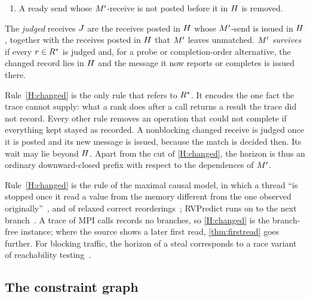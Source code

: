 \begin{definition}[Horizon]
\begin{enumerate}[leftmargin=*,label=(H\arabic*)]
  $\Hpre$ stays pending. Any later receive or probe of its rank that would take or report
  a message $r'$ accepts is removed, by \ref{E:order}.
\item\label{H:ready} A ready send whose $M'$-receive is not posted before it in
  $\Hpre$ is removed.
\end{enumerate}
The \emph{judged} receives $J$ are the receives posted in $\Hpre$ whose
$M'$-send is issued in $\Hpre$, together with the receives posted in $\Hpre$ that
$M'$ leaves unmatched. $M'$ \emph{survives} if every $r\in R^{*}$ is judged and, for a
probe or completion-order alternative, the changed record lies in $\Hpre$ and the message it now
reports or completes is issued there.
\end{definition}

Rule~\ref{H:changed} is
the only rule that refers to $R^{*}$. It encodes the one fact the trace cannot
supply: what a rank does after a call returns a result the trace did not record. Every
other rule removes an operation that could not complete if everything kept stayed as
recorded. A nonblocking changed receive is judged once it is posted and its new message
is issued, because the match is decided then. Its wait may lie beyond $\Hpre$. Apart from
the cut of \ref{H:changed}, the horizon is thus an ordinary downward-closed prefix with
respect to the dependences of $M'$.

Rule~\ref{H:changed} is the rule of the maximal causal model, in which a thread ``is stopped
once it read a value from the memory different from the one observed
originally''~\citep{serbanuta12mcm}, and of relaxed correct reorderings~\citep{mathur18shb};
RVPredict runs on to the next branch~\citep{huang14rvpredict}. A trace of MPI calls records no
branches, so \ref{H:changed} is the branch-free instance; where the source shows a later first
read, \cref{thm:firstread} goes further. For blocking traffic, the horizon of a steal corresponds to a race
variant of reachability testing~\citep{lei06reachability}.

\subsection{The constraint graph}
\label{sec:graph}

